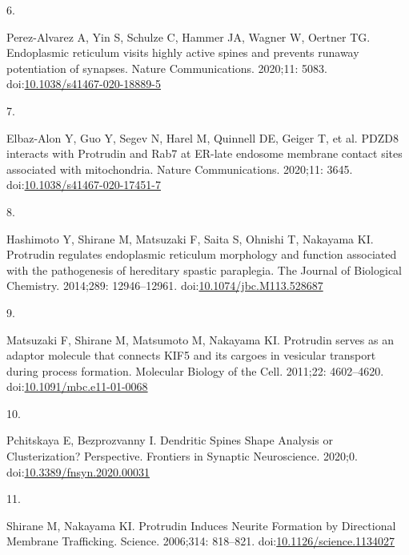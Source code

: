 \documentclass[
  12pt,
  a4paper,
]{book}
\newlength{\cslhangindent}
\newlength{\csllabelwidth}
\newlength{\cslentryspacingunit} %
\newenvironment{CSLReferences}[2] %
 {%
  \setlength{\parindent}{0pt}
  \ifodd #1
  \let\oldpar\par
  \def\par{\hangindent=\cslhangindent\oldpar}
  \fi
  \setlength{\parskip}{#2\cslentryspacingunit}
 }%
 {}
\newcommand{\CSLLeftMargin}[1]{\parbox[t]{\csllabelwidth}{#1}}
\newcommand{\CSLRightInline}[1]{\parbox[t]{\linewidth - \csllabelwidth}{#1}\break}
\begin{document}
\begin{CSLReferences}{0}{0}
\leavevmode{}%
\CSLLeftMargin{6. }%
\CSLRightInline{Perez-Alvarez A, Yin S, Schulze C, Hammer JA, Wagner W, Oertner TG. Endoplasmic reticulum visits highly active spines and prevents runaway potentiation of synapses. Nature Communications. 2020;11: 5083. doi:\href{https://doi.org/10.1038/s41467-020-18889-5}{10.1038/s41467-020-18889-5}}

\leavevmode{}%
\CSLLeftMargin{7. }%
\CSLRightInline{Elbaz-Alon Y, Guo Y, Segev N, Harel M, Quinnell DE, Geiger T, et al. {PDZD8} interacts with {Protrudin} and {Rab7} at {ER-late} endosome membrane contact sites associated with mitochondria. Nature Communications. 2020;11: 3645. doi:\href{https://doi.org/10.1038/s41467-020-17451-7}{10.1038/s41467-020-17451-7}}

\leavevmode{}%
\CSLLeftMargin{8. }%
\CSLRightInline{Hashimoto Y, Shirane M, Matsuzaki F, Saita S, Ohnishi T, Nakayama KI. Protrudin regulates endoplasmic reticulum morphology and function associated with the pathogenesis of hereditary spastic paraplegia. The Journal of Biological Chemistry. 2014;289: 12946--12961. doi:\href{https://doi.org/10.1074/jbc.M113.528687}{10.1074/jbc.M113.528687}}

\leavevmode{}%
\CSLLeftMargin{9. }%
\CSLRightInline{Matsuzaki F, Shirane M, Matsumoto M, Nakayama KI. Protrudin serves as an adaptor molecule that connects {KIF5} and its cargoes in vesicular transport during process formation. Molecular Biology of the Cell. 2011;22: 4602--4620. doi:\href{https://doi.org/10.1091/mbc.e11-01-0068}{10.1091/mbc.e11-01-0068}}

\leavevmode{}%
\CSLLeftMargin{10. }%
\CSLRightInline{Pchitskaya E, Bezprozvanny I. Dendritic {Spines Shape Analysis}\textemdash{{Classification}} or {Clusterization}? {Perspective}. Frontiers in Synaptic Neuroscience. 2020;0. doi:\href{https://doi.org/10.3389/fnsyn.2020.00031}{10.3389/fnsyn.2020.00031}}

\leavevmode{}%
\CSLLeftMargin{11. }%
\CSLRightInline{Shirane M, Nakayama KI. Protrudin {Induces Neurite Formation} by {Directional Membrane Trafficking}. Science. 2006;314: 818--821. doi:\href{https://doi.org/10.1126/science.1134027}{10.1126/science.1134027}}


\end{CSLReferences}
\end{document}
